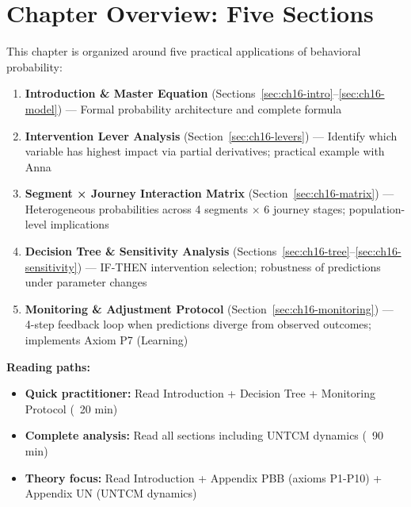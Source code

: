 
\section*{Chapter Overview: Five Sections}

This chapter is organized around five practical applications of behavioral probability:

\begin{enumerate}[label=\textbf{\arabic*.}]

\item \textbf{Introduction \& Master Equation} (Sections~\ref{sec:ch16-intro}--\ref{sec:ch16-model})
   — Formal probability architecture and complete formula

\item \textbf{Intervention Lever Analysis} (Section~\ref{sec:ch16-levers})
   — Identify which variable has highest impact via partial derivatives; practical example with Anna

\item \textbf{Segment × Journey Interaction Matrix} (Section~\ref{sec:ch16-matrix})
   — Heterogeneous probabilities across 4 segments × 6 journey stages; population-level implications

\item \textbf{Decision Tree \& Sensitivity Analysis} (Sections~\ref{sec:ch16-tree}--\ref{sec:ch16-sensitivity})
   — IF-THEN intervention selection; robustness of predictions under parameter changes

\item \textbf{Monitoring \& Adjustment Protocol} (Section~\ref{sec:ch16-monitoring})
   — 4-step feedback loop when predictions diverge from observed outcomes; implements Axiom P7 (Learning)

\end{enumerate}

\textbf{Reading paths:}
\begin{itemize}[nosep]
   \item \textbf{Quick practitioner:} Read Introduction + Decision Tree + Monitoring Protocol (~20 min)
   \item \textbf{Complete analysis:} Read all sections including UNTCM dynamics (~90 min)
   \item \textbf{Theory focus:} Read Introduction + Appendix PBB (axioms P1-P10) + Appendix UN (UNTCM dynamics)
\end{itemize}

